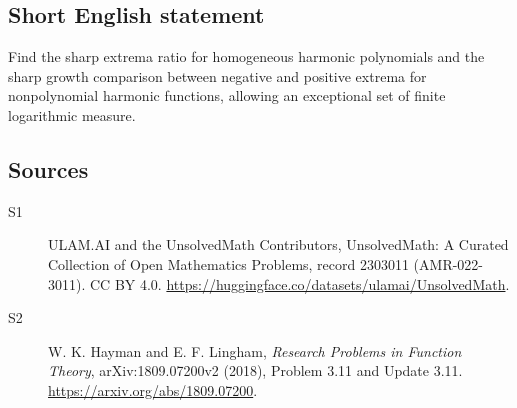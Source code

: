 \documentclass[11pt]{article}
\begin{document}
\subsection{Short English statement}
Find the sharp extrema ratio for homogeneous harmonic polynomials and the sharp growth comparison between negative and positive extrema for nonpolynomial harmonic functions, allowing an exceptional set of finite logarithmic measure.
\subsection{Sources}
\begin{description}
\item[\hypertarget{source:2303011:1}{S1}] ULAM.AI and the UnsolvedMath Contributors, UnsolvedMath: A Curated Collection of Open Mathematics Problems, record 2303011 (AMR-022-3011). CC BY 4.0. \url{https://huggingface.co/datasets/ulamai/UnsolvedMath}.
\item[\hypertarget{source:2303011:2}{S2}] W. K. Hayman and E. F. Lingham, \emph{Research Problems in Function Theory}, arXiv:1809.07200v2 (2018), Problem 3.11 and Update 3.11. \url{https://arxiv.org/abs/1809.07200}.
\end{description}
\label{end:2303011}
\end{document}
